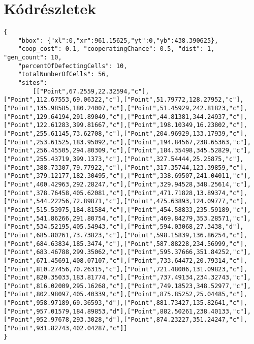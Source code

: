 \chapter{Kódrészletek}
\label{ch:appendix}

\begin{lstlisting}[caption=A Kliens üzenete amikor egy szimulációt kér]
{
	"bbox": {"xl":0,"xr":961.15625,"yt":0,"yb":438.390625},
	"coop_cost": 0.1, "cooperatingChance": 0.5, "dist": 1, "gen_count": 10,
	"percentOfDefectingCells": 10,
	"totalNumberOfCells": 56,
	"sites":
		[["Point",67.2559,22.32594,"c"],["Point",112.67553,69.06322,"c"],["Point",51.79772,128.27952,"c"],["Point",135.98585,180.24007,"c"],["Point",51.45929,242.81823,"c"],["Point",129.64194,291.89049,"c"],["Point",44.81381,344.24937,"c"],["Point",122.61283,399.81667,"c"],["Point",198.10349,16.23802,"c"],["Point",255.61145,73.62708,"c"],["Point",204.96929,133.17939,"c"],["Point",253.61525,183.95092,"c"],["Point",194.84567,238.65363,"c"],["Point",256.45505,294.80309,"c"],["Point",184.35498,345.52829,"c"],["Point",255.43719,399.1373,"c"],["Point",327.54444,25.25875,"c"],["Point",388.73307,79.77922,"c"],["Point",317.35744,123.39859,"c"],["Point",379.12177,182.30495,"c"],["Point",338.69507,241.04011,"c"],["Point",400.42963,292.28247,"c"],["Point",329.94528,348.25614,"c"],["Point",378.76458,405.62081,"c"],["Point",471.71828,13.89374,"c"],["Point",544.22256,72.89871,"c"],["Point",475.63893,124.09777,"c"],["Point",515.53975,184.81584,"c"],["Point",454.58833,235.59189,"c"],["Point",541.86266,291.80754,"c"],["Point",469.84279,353.28571,"c"],["Point",534.52195,405.54943,"c"],["Point",594.03068,27.3438,"d"],["Point",685.80261,73.73823,"c"],["Point",598.15839,136.86254,"c"],["Point",684.63834,185.3474,"c"],["Point",587.88228,234.56999,"c"],["Point",683.46788,299.35062,"c"],["Point",595.37666,351.84252,"c"],["Point",671.45691,408.07107,"c"],["Point",733.64472,20.79314,"c"],["Point",810.27456,70.26315,"c"],["Point",721.48006,131.09823,"c"],["Point",820.35033,183.81774,"c"],["Point",737.49134,234.32743,"c"],["Point",816.02009,295.16268,"c"],["Point",749.18523,348.52977,"c"],["Point",802.98097,405.40339,"c"],["Point",875.85252,25.04485,"c"],["Point",958.97189,69.36593,"d"],["Point",881.73427,135.82641,"c"],["Point",957.01579,184.89853,"d"],["Point",882.50261,238.40133,"c"],["Point",952.97678,293.3028,"d"],["Point",874.23227,351.24247,"c"],["Point",931.82743,402.04287,"c"]]
}
\end{lstlisting}
